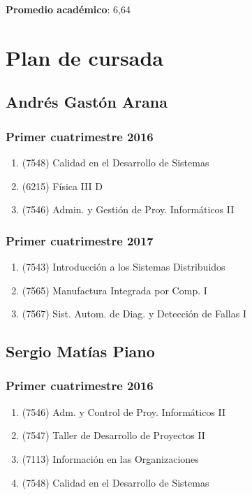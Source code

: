 \documentclass[a4paper,11pt]{article}
\begin{document}
\textbf{Promedio académico}: 6,64

\section{Plan de cursada}

\subsection{Andrés Gastón Arana}

\subsubsection{Primer cuatrimestre 2016}

\begin{enumerate}
  \item (7548) Calidad en el Desarrollo de Sistemas
  \item (6215) Física III D
  \item (7546) Admin. y Gestión de Proy. Informáticos II
\end{enumerate}

\subsubsection{Primer cuatrimestre 2017}

\begin{enumerate}
  \item (7543) Introducción a los Sistemas Distribuidos
  \item (7565) Manufactura Integrada por Comp. I
  \item (7567) Sist. Autom. de Diag. y Detección de Fallas I
\end{enumerate}

\subsection{Sergio Matías Piano}

\subsubsection{Primer cuatrimestre 2016}

\begin{enumerate}
  \item (7546) Adm. y Control de Proy. Informáticos II
  \item (7547) Taller de Desarrollo de Proyectos II
  \item (7113) Información en las Organizaciones
  \item (7548) Calidad en el Desarrollo de Sistemas
\end{enumerate}
\end{document}
